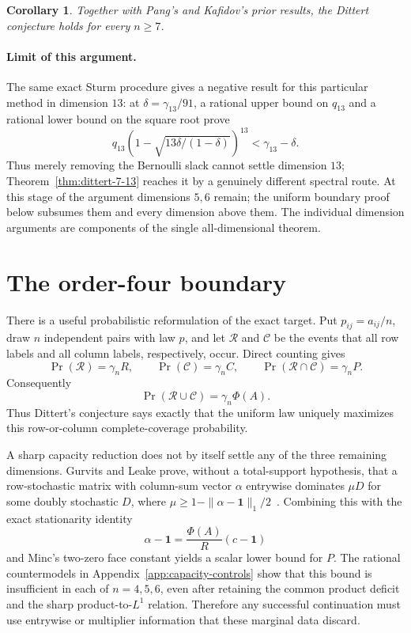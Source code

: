 \documentclass[11pt]{amsart}
\newtheorem{corollary}[theorem]{Corollary}
\theoremstyle{definition}
\theoremstyle{remark}
\begin{document}
\begin{corollary}
Together with Pang's and Kafidov's prior results, the Dittert conjecture
holds for every \(n\geq7\).
\end{corollary}

\paragraph{Limit of this argument.}
The same exact Sturm procedure gives a negative result for this particular
method in dimension \(13\):
at \(\delta=\gamma_{13}/91\), a rational upper bound on \(q_{13}\) and a
rational lower bound on the square root prove
\[
q_{13}(1-\sqrt{13\delta/(1-\delta)})^{13}
 <\gamma_{13}-\delta.
\]
Thus merely removing the Bernoulli slack cannot settle dimension \(13\);
Theorem~\ref{thm:dittert-7-13} reaches it by a genuinely different
spectral route. At this stage of the argument dimensions \(5,6\) remain;
the uniform boundary proof below subsumes them and every dimension above
them. The individual dimension arguments are components of the single
all-dimensional theorem.

\section{The order-four boundary}\label{sec:n4}

There is a useful probabilistic reformulation of the exact target.  Put
\(p_{ij}=a_{ij}/n\), draw \(n\) independent pairs with law \(p\), and let
\(\mathcal R\) and \(\mathcal C\) be the events that all row labels and all
column labels, respectively, occur.  Direct counting gives
\[
 \Pr(\mathcal R)=\gamma_nR,\qquad
 \Pr(\mathcal C)=\gamma_nC,\qquad
 \Pr(\mathcal R\cap\mathcal C)=\gamma_nP.
\]
Consequently
\[
 \Pr(\mathcal R\cup\mathcal C)=\gamma_n\Phi(A).
\]
Thus Dittert's conjecture says exactly that the uniform law uniquely
maximizes this row-or-column complete-coverage probability.

A sharp capacity reduction does not by itself settle any of the three
remaining dimensions.  Gurvits and Leake prove, without a total-support
hypothesis, that a row-stochastic matrix with column-sum vector \(\alpha\)
entrywise dominates \(\mu D\) for some doubly stochastic \(D\), where
\(\mu\geq1-\|\alpha-\mathbf1\|_1/2\)~\cite[Theorem 5.5]{GL}.
Combining this with the exact stationarity identity
\[
 \alpha-\mathbf1=\frac{\Phi(A)}R(c-\mathbf1)
\]
and Minc's two-zero face constant yields a scalar lower bound for \(P\).
The rational countermodels in Appendix~\ref{app:capacity-controls} show that
this bound is insufficient in each of \(n=4,5,6\), even after retaining the
common product deficit and the sharp product-to-\(L^1\) relation.  Therefore
any successful continuation must use entrywise or multiplier information
that these marginal data discard.
\end{document}
